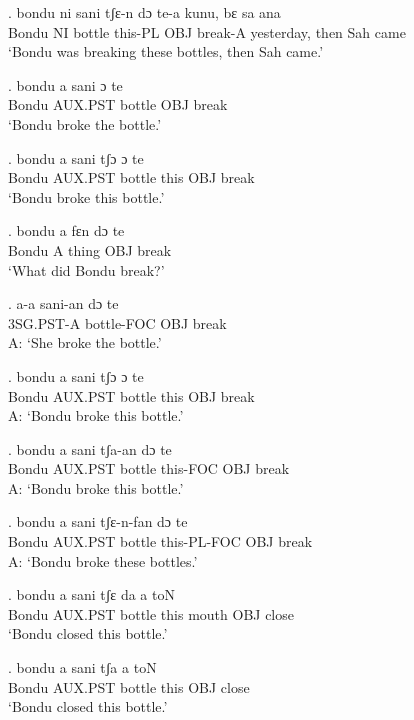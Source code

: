 \documentclass{assets/fieldnotes}
\begin{document}
\exg.
bondu   ni   sani     tʃɛ-n     dɔ    te-a      kunu,        bɛ     sa    ana  \\
Bondu   NI   bottle   this-PL   OBJ   break-A   yesterday,   then   Sah   came \\%
`Bondu was breaking these bottles, then Sah came.'

\exg.
bondu   a   sani     ɔ     te    \\
Bondu   AUX.PST   bottle   OBJ   break \\%
`Bondu broke the bottle.'

\exg.
bondu   a   sani     tʃɔ    ɔ     te    \\
Bondu   AUX.PST   bottle   this   OBJ   break \\%
`Bondu broke this bottle.'

\exg.
bondu   a   fɛn     dɔ    te    \\
Bondu   A   thing   OBJ   break \\%
`What did Bondu break?'

\exg.
a-a      sani-an      dɔ    te    \\
3SG.PST-A   bottle-FOC   OBJ   break \\%
A: `She broke the bottle.'

\exg.
bondu   a   sani     tʃɔ    ɔ     te    \\
Bondu   AUX.PST   bottle   this   OBJ   break \\%
A: `Bondu broke this bottle.'

\exg.
bondu   a   sani     tʃa-an     dɔ    te    \\
Bondu   AUX.PST   bottle   this-FOC   OBJ   break \\%
A: `Bondu broke this bottle.'

\exg.
bondu   a   sani     tʃɛ-n-fan     dɔ    te    \\
Bondu   AUX.PST   bottle   this-PL-FOC   OBJ   break \\%
A: `Bondu broke these bottles.'

\exg.
bondu   a   sani     tʃɛ    da      a     toN   \\
Bondu   AUX.PST   bottle   this   mouth   OBJ   close \\%
`Bondu closed this bottle.'

\exg.
bondu   a   sani     tʃa    a     toN   \\
Bondu   AUX.PST   bottle   this   OBJ   close \\%
`Bondu closed this bottle.'

\end{document}
